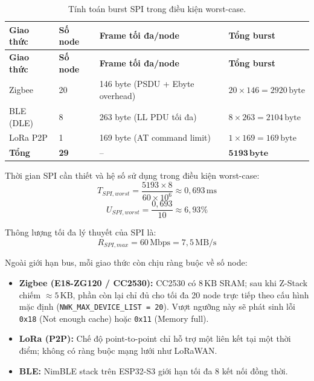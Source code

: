         \begin{longtable}{|p{3cm}|p{2cm}|p{3.5cm}|p{4.5cm}|}
            \caption{Tính toán burst SPI trong điều kiện worst-case.} \label{tab:spi_worst} \\
            \hline
            \textbf{Giao thức} & \textbf{Số node} & \textbf{Frame tối đa/node} & \textbf{Tổng burst} \\ \hline
            \endfirsthead
            \hline
            \textbf{Giao thức} & \textbf{Số node} & \textbf{Frame tối đa/node} & \textbf{Tổng burst} \\ \hline
            \endhead
            \hline
            \endfoot
            \endlastfoot
            Zigbee   & 20 & 146 byte (PSDU + Ebyte overhead) & $20 \times 146 = 2920\,\text{byte}$ \\ \hline
            BLE (DLE) & 8  & 263 byte (LL PDU tối đa)         & $8 \times 263 = 2104\,\text{byte}$  \\ \hline
            LoRa P2P & 1  & 169 byte (AT command limit)       & $1 \times 169 = 169\,\text{byte}$   \\ \hline
            \textbf{Tổng} & \textbf{29} & -- & $\mathbf{5193\,\text{byte}}$ \\ \hline
        \end{longtable}
        
        Thời gian SPI cần thiết và hệ số sử dụng trong điều kiện worst-case:
        \[ T_{SPI,worst} = \frac{5193 \times 8}{60 \times 10^6} \approx 0{,}693\,\text{ms} \]
        \[ U_{SPI,worst} = \frac{0{,}693}{10} \approx 6{,}93\% \]
        
        Thông lượng tối đa lý thuyết của SPI là:
        \[ R_{SPI,max} = 60\,\text{Mbps} = 7{,}5\,\text{MB/s} \]
        
        Ngoài giới hạn bus, mỗi giao thức còn chịu ràng buộc về số node:
        
        \begin{itemize}
            \item \textbf{Zigbee (E18-ZG120 / CC2530):} CC2530 có $8\,\text{KB}$ SRAM; sau khi Z-Stack chiếm $\approx 5\,\text{KB}$, phần còn lại chỉ đủ cho tối đa 20 node trực tiếp theo cấu hình mặc định (\texttt{NWK\_MAX\_DEVICE\_LIST = 20}). Vượt ngưỡng này sẽ phát sinh lỗi \texttt{0x18} (Not enough cache) hoặc \texttt{0x11} (Memory full).
            \item \textbf{LoRa (P2P):} Chế độ point-to-point chỉ hỗ trợ một liên kết tại một thời điểm; không có ràng buộc mạng lưới như LoRaWAN.
            \item \textbf{BLE:} NimBLE stack trên ESP32-S3 giới hạn tối đa 8 kết nối đồng thời.
        \end{itemize}
        
